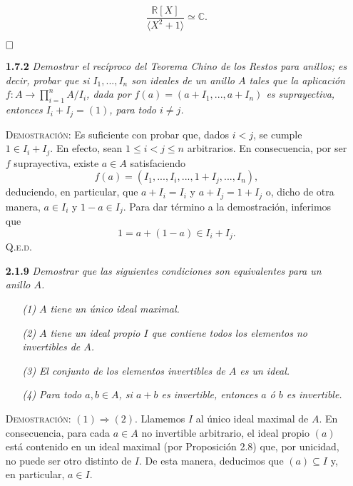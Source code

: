 \documentclass{article}
\begin{document}
\begin{enumerate}
    \[\frac{\mathbb{R}[X]}{\langle X^2 + 1 \rangle} \simeq \mathbb{C}.\]

    $\hfill\square$

    \vspace{12px}

    \item[\textbf{1.7.2}] \textit{Demostrar el recíproco del Teorema Chino de los Restos para anillos; es decir, probar que si $I_1, ..., I_n$ son ideales de un anillo $A$ tales que la aplicación $f : A \to \prod_{i=1}^{n} A / I_i$, dada por $f(a) = (a + I_1, ..., a + I_n)$ es suprayectiva, entonces $I_i + I_j = (1)$, para todo $i \neq j$.}

    \vspace{7px}

    \textsc{Demostración}: Es suficiente con probar que, dados $i < j$, se cumple $1 \in I_i + I_j$. En efecto, sean $1 \leq i < j \leq n$ arbitrarios. En consecuencia, por ser $f$ suprayectiva, existe $a \in A$ satisfaciendo \[f(a) = (I_1, ..., I_i, ..., 1 + I_j, ..., I_n),\] deduciendo, en particular, que $a + I_i = I_i$ y $a + I_j = 1 + I_j$ o, dicho de otra manera, $a \in I_i$ y $1 - a \in I_j$. Para dar término a la demostración, inferimos que \[1 = a + (1 - a) \in I_i + I_j.\] \hfill{\textsc{Q.e.d.}}

    \newpage

    \item[\textbf{2.1.9}] \textit{Demostrar que las siguientes condiciones son equivalentes para un anillo $A$.}
    \begin{itemize}
        \item[\textit{(1)}] \textit{$A$ tiene un único ideal maximal.}
        \item[\textit{(2)}] \textit{$A$ tiene un ideal propio $I$ que contiene todos los elementos no invertibles de $A$.}
        \item[\textit{(3)}] \textit{El conjunto de los elementos invertibles de $A$ es un ideal.}
        \item[\textit{(4)}] \textit{Para todo $a, b \in A$, si $a + b$ es invertible, entonces $a$ ó $b$ es invertible.}
    \end{itemize}

    \vspace{7px}

    \textsc{Demostración}: $(1) \Rightarrow (2)$. Llamemos $I$ al único ideal maximal de $A$. En consecuencia, para cada $a \in A$ no invertible arbitrario, el ideal propio $(a)$ está contenido en un ideal maximal (por Proposición 2.8) que, por unicidad, no puede ser otro distinto de $I$. De esta manera, deducimos que $(a) \subseteq I$ y, en particular, $a \in I$.


\end{enumerate}
\end{document}
